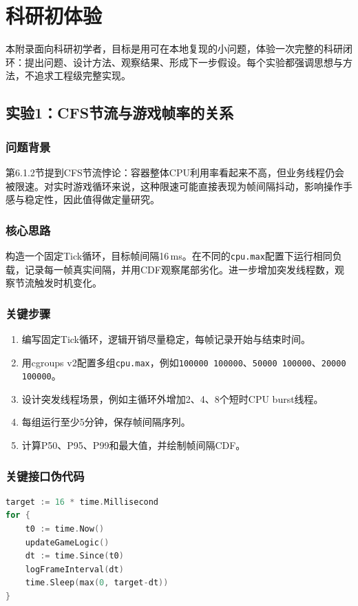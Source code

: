 \section{科研初体验}
\label{sec:appendix-research-lab}

本附录面向科研初学者，目标是用可在本地复现的小问题，体验一次完整的科研闭环：提出问题、设计方法、观察结果、形成下一步假设。每个实验都强调思想与方法，不追求工程级完整实现。

\subsection{实验1：CFS节流与游戏帧率的关系}

\subsubsection{问题背景}
第6.1.2节提到CFS节流悖论：容器整体CPU利用率看起来不高，但业务线程仍会被限速。对实时游戏循环来说，这种限速可能直接表现为帧间隔抖动，影响操作手感与稳定性，因此值得做定量研究。

\subsubsection{核心思路}
构造一个固定Tick循环，目标帧间隔16\,ms。在不同的\texttt{cpu.max}配置下运行相同负载，记录每一帧真实间隔，并用CDF观察尾部劣化。进一步增加突发线程数，观察节流触发时机变化。

\subsubsection{关键步骤}
\begin{enumerate}
\item 编写固定Tick循环，逻辑开销尽量稳定，每帧记录开始与结束时间。
\item 用cgroups v2配置多组\texttt{cpu.max}，例如\texttt{100000 100000}、\texttt{50000 100000}、\texttt{20000 100000}。
\item 设计突发线程场景，例如主循环外增加2、4、8个短时CPU burst线程。
\item 每组运行至少5分钟，保存帧间隔序列。
\item 计算P50、P95、P99和最大值，并绘制帧间隔CDF。
\end{enumerate}

\subsubsection{关键接口伪代码}
\begin{tcolorbox}[title=游戏Tick循环与帧间隔记录]
\begin{lstlisting}[style=codeblock, language=go]
target := 16 * time.Millisecond
for {
    t0 := time.Now()
    updateGameLogic()
    dt := time.Since(t0)
    logFrameInterval(dt)
    time.Sleep(max(0, target-dt))
}
\end{lstlisting}
\end{tcolorbox}

